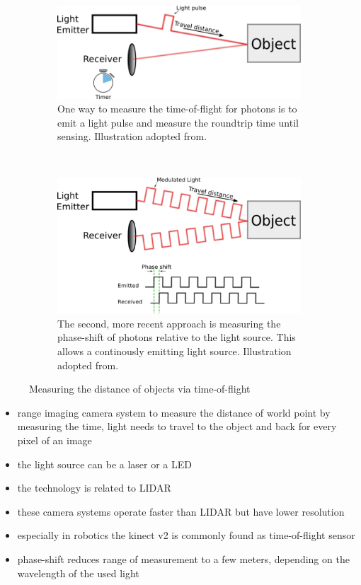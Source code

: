 \begin{figure}[H]
    \centering
    \begin{subfigure}[t]{0.45\textwidth}
        \includegraphics[width=\textwidth]{chapter03/img/tof_traveltime_original.png}
        \caption{One way to measure the time-of-flight for photons is to emit a light pulse and measure the roundtrip time until sensing. Illustration adopted from\cite{tof_cameras}.}
    \end{subfigure}~
    \begin{subfigure}[t]{0.45\textwidth}
        \includegraphics[width=\textwidth]{chapter03/img/tof_phase_shift_original.png}
        \caption{The second, more recent approach is measuring the phase-shift of photons relative to the light source. This allows a continously emitting light source. Illustration adopted from\cite{tof_cameras}.}
    \end{subfigure}
    \caption[Illustration of two commonly used measuring principle for Time-of-Flight cameras]{Measuring the distance of objects via time-of-flight\label{fig:tof_illustration}}
\end{figure}

\begin{itemize}
    \item range imaging camera system to measure the distance of world point by measuring the time, light needs to travel to the object and back for every pixel of an image
    \item the light source can be a laser or a LED
    \item the technology is related to \acrshort{LIDAR}
    \item these camera systems operate faster than \acrshort{LIDAR} but have lower resolution
    \item especially in robotics the kinect v2 is commonly found as time-of-flight sensor
    \item phase-shift reduces range of measurement to a few meters, depending on the wavelength of the used light
\end{itemize}

